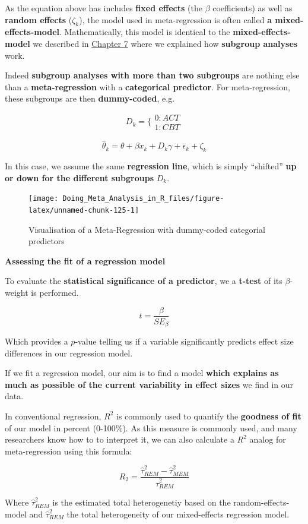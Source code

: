 \documentclass[]{book}
\begin{document}
\begin{rmdinfo}
As the equation above has includes \textbf{fixed effects} (the \(\beta\)
coefficients) as well as \textbf{random effects} (\(\zeta_k\)), the
model used in meta-regression is often called \textbf{a
mixed-effects-model}. Mathematically, this model is identical to the
\textbf{mixed-effects-model} we described in
\protect\hyperlink{subgroup}{Chapter 7} where we explained how
\textbf{subgroup analyses} work.

Indeed \textbf{subgroup analyses with more than two subgroups} are
nothing else than a \textbf{meta-regression} with a \textbf{categorical
predictor}. For meta-regression, these subgroups are then
\textbf{dummy-coded}, e.g.

\[ D_k =  \{\begin{array}{c}0:ACT \\1:CBT \end{array}\]

\[\hat \theta_k = \theta + \beta x_{k} + D_k \gamma + \epsilon_k + \zeta_k\]

In this case, we assume the same \textbf{regression line}, which is
simply ``shifted'' \textbf{up or down for the different subgroups}
\(D_k\).
\end{rmdinfo}

\begin{figure}

{\centering \texttt{[image: Doing\_Meta\_Analysis\_in\_R\_files/figure-latex/unnamed-chunk-125-1]} 

}

\caption{Visualisation of a Meta-Regression with dummy-coded categorial predictors}\label{fig:unnamed-chunk-125}
\end{figure}

\begin{rmdinfo}
\textbf{Assessing the fit of a regression model}

To evaluate the \textbf{statistical significance of a predictor}, we a
\textbf{t-test} of its \(\beta\)-weight is performed.

\[ t=\frac{\beta}{SE_{\beta}}\]

Which provides a \(p\)-value telling us if a variable significantly
predicts effect size differences in our regression model.

If we fit a regression model, our aim is to find a model \textbf{which
explains as much as possible of the current variability in effect sizes}
we find in our data.

In conventional regression, \(R^2\) is commonly used to quantify the
\textbf{goodness of fit} of our model in percent (0-100\%). As this
measure is commonly used, and many researchers know how to to interpret
it, we can also calculate a \(R^2\) analog for meta-regression using
this formula:

\[R_2=\frac{\hat\tau^2_{REM}-\hat\tau^2_{MEM}}{\hat\tau^2_{REM}}\]

Where \(\hat\tau^2_{REM}\) is the estimated total heterogenetiy based on
the random-effects-model and \(\hat\tau^2_{REM}\) the total
heterogeneity of our mixed-effects regression model.
\end{rmdinfo}
\end{document}
